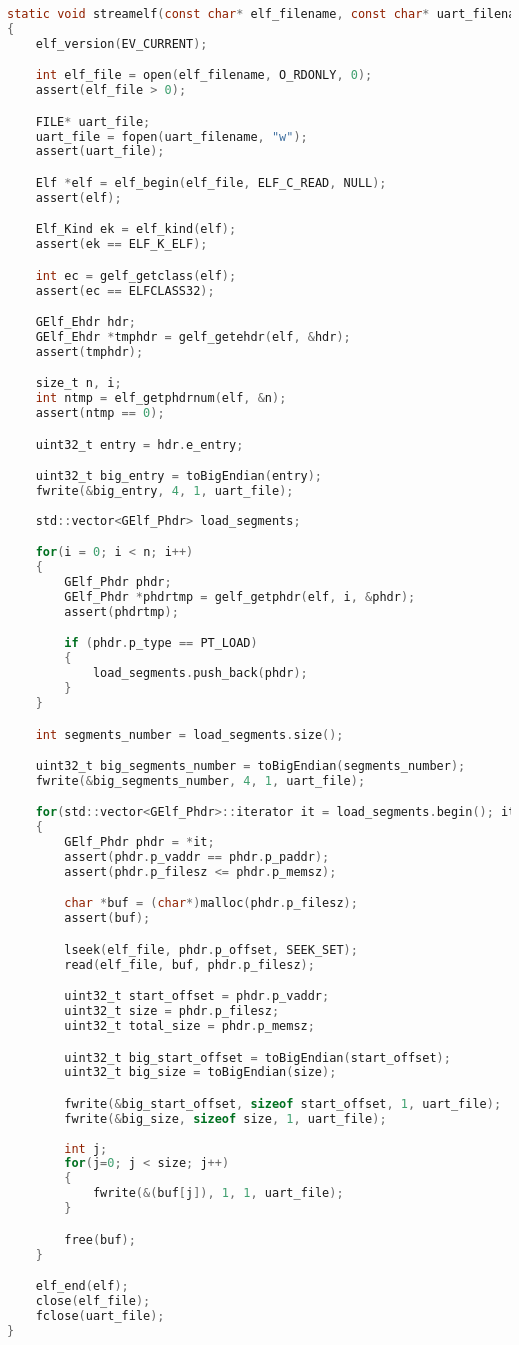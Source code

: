 \begin{lstlisting}[language=C, caption=Functions to stream an \texttt{ELF} file to the \texttt{UART} file, label=lst:streamelf]
static void streamelf(const char* elf_filename, const char* uart_filename)
{
	elf_version(EV_CURRENT);

	int elf_file = open(elf_filename, O_RDONLY, 0);
	assert(elf_file > 0);

	FILE* uart_file;
	uart_file = fopen(uart_filename, "w");
	assert(uart_file);

	Elf *elf = elf_begin(elf_file, ELF_C_READ, NULL);
	assert(elf);

	Elf_Kind ek = elf_kind(elf);
	assert(ek == ELF_K_ELF);

	int ec = gelf_getclass(elf);
	assert(ec == ELFCLASS32);

	GElf_Ehdr hdr;
	GElf_Ehdr *tmphdr = gelf_getehdr(elf, &hdr);
	assert(tmphdr);

	size_t n, i;
	int ntmp = elf_getphdrnum(elf, &n);
	assert(ntmp == 0);

	uint32_t entry = hdr.e_entry;

	uint32_t big_entry = toBigEndian(entry);
	fwrite(&big_entry, 4, 1, uart_file);
  
	std::vector<GElf_Phdr> load_segments;

	for(i = 0; i < n; i++)
	{
	    GElf_Phdr phdr;
    	GElf_Phdr *phdrtmp = gelf_getphdr(elf, i, &phdr);
    	assert(phdrtmp);

    	if (phdr.p_type == PT_LOAD)
    	{
			load_segments.push_back(phdr);
		}
	}

	int segments_number = load_segments.size();

	uint32_t big_segments_number = toBigEndian(segments_number);
	fwrite(&big_segments_number, 4, 1, uart_file);

	for(std::vector<GElf_Phdr>::iterator it = load_segments.begin(); it != load_segments.end(); ++it) 
	{
		GElf_Phdr phdr = *it;
		assert(phdr.p_vaddr == phdr.p_paddr);
		assert(phdr.p_filesz <= phdr.p_memsz);

		char *buf = (char*)malloc(phdr.p_filesz);
		assert(buf);

		lseek(elf_file, phdr.p_offset, SEEK_SET);
		read(elf_file, buf, phdr.p_filesz);

		uint32_t start_offset = phdr.p_vaddr;
		uint32_t size = phdr.p_filesz;
		uint32_t total_size = phdr.p_memsz;

		uint32_t big_start_offset = toBigEndian(start_offset);
		uint32_t big_size = toBigEndian(size);

		fwrite(&big_start_offset, sizeof start_offset, 1, uart_file);
		fwrite(&big_size, sizeof size, 1, uart_file);
        
		int j;        
		for(j=0; j < size; j++)
		{
			fwrite(&(buf[j]), 1, 1, uart_file);
		}

		free(buf);
	}

	elf_end(elf);
	close(elf_file);
	fclose(uart_file);
}
\end{lstlisting}

